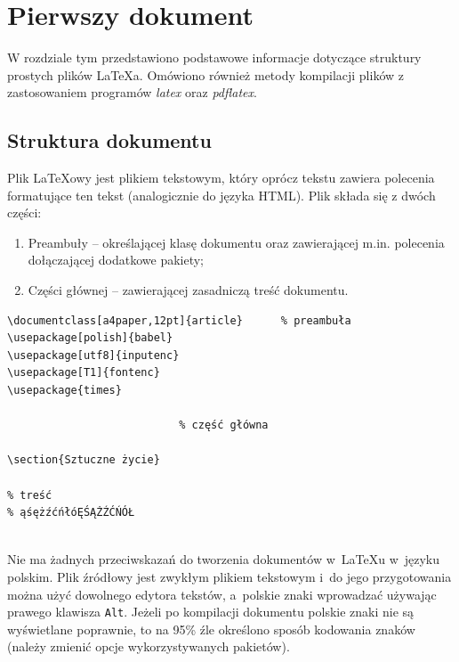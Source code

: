 \chapter{Pierwszy dokument}
\label{cha:pierwszyDokument}

W rozdziale tym przedstawiono podstawowe informacje dotyczące struktury prostych plików \LaTeX a. Omówiono również metody kompilacji plików z zastosowaniem programów \emph{latex} oraz \emph{pdflatex}.


\section{Struktura dokumentu}
\label{sec:strukturaDokumentu}

Plik \LaTeX owy jest plikiem tekstowym, który oprócz tekstu zawiera polecenia formatujące ten tekst (analogicznie do języka HTML). Plik składa się z dwóch części:
\begin{enumerate}%
      \item Preambuły -- określającej klasę dokumentu oraz zawierającej m.in. polecenia dołączającej dodatkowe pakiety;

      \item Części głównej -- zawierającej zasadniczą treść dokumentu.
\end{enumerate}

\begin{lstlisting}
\documentclass[a4paper,12pt]{article}      % preambuła
\usepackage[polish]{babel}
\usepackage[utf8]{inputenc}
\usepackage[T1]{fontenc}
\usepackage{times}

                           % część główna

\section{Sztuczne życie}

% treść
% ąśężźćńłóĘŚĄŻŹĆŃÓŁ


\end{lstlisting}

Nie ma żadnych przeciwskazań do tworzenia dokumentów w~\LaTeX u w~języku polskim. Plik źródłowy jest zwykłym plikiem tekstowym i~do jego przygotowania można użyć dowolnego edytora tekstów, a~polskie znaki wprowadzać używając prawego klawisza \texttt{Alt}. Jeżeli po kompilacji dokumentu polskie znaki nie są wyświetlane poprawnie, to na 95\% źle określono sposób kodowania znaków (należy zmienić opcje wykorzystywanych pakietów).


